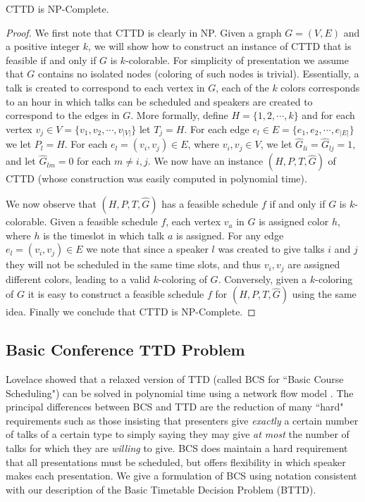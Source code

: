 \documentclass{svjour3}                     %
\begin{document}
\begin{proposition}\label{cttd_np}
	CTTD is NP-Complete.
\end{proposition}
\begin{proof}
We first note that CTTD is clearly in NP.  
Given a graph $G=(V,E)$ and a positive integer $k$, we will show how to construct an instance of CTTD that is feasible if and only if $G$ is $k$-colorable.
For simplicity of presentation we assume that $G$ contains no isolated nodes (coloring of such nodes is trivial).
Essentially, a talk is created to correspond to each vertex in $G$, each of the $k$ colors corresponds to an hour in which talks can be scheduled and speakers are created to correspond to the edges in $G$.
More formally, define $H=\{1, 2, \cdots, k\}$ and for each vertex $v_j \in V=\{v_1, v_2, \cdots, v_{|V|}\}$ let $T_j = H$. 
For each edge $e_l \in E=\{e_1, e_2, \cdots, e_{|E|}\}$ we let $P_l = H$. 
For each $e_l = (v_i,v_j)\in E$, where $v_i,v_j \in V$, we let $\hat G_{li} = \hat G_{lj} = 1$, and let $\hat G_{lm}=0$ for each $m\neq i,j$. 
We now have an instance $(H, P, T, \hat G)$ of CTTD (whose construction was easily computed in polynomial time). 

We now observe that $(H, P, T, \hat G)$ has a feasible schedule $f$ if and only if $G$ is $k$-colorable.
Given a feasible schedule $f$, each vertex $v_a$ in $G$ is assigned color $h$, where $h$ is the timeslot in which talk $a$ is assigned.
For any edge $e_l=(v_i,v_j)\in E$ we note that since a speaker $l$ was created to give talks $i$ and $j$ they will not be scheduled in the same time slots, and thus $v_i,v_j$ are assigned different colors, leading to a valid $k$-coloring of $G$.
Conversely, given a $k$-coloring of $G$ it is easy to construct a feasible schedule $f$ for $(H, P, T, \hat G)$ using the same idea.
Finally we conclude that CTTD is NP-Complete.
\end{proof}


\subsection{Basic Conference TTD Problem}
Lovelace showed that a relaxed version of TTD (called BCS for ``Basic Course Scheduling") can be solved in polynomial time using a network flow model \cite{lovelace2010}. 
The principal differences between BCS and TTD are the reduction of many ``hard" requirements such as those insisting that presenters give \emph{exactly} a certain number of talks of a certain type to simply saying they may give \emph{at most} the number of talks for which they are \emph{willing} to give. 
BCS does maintain a hard requirement that all presentations must be scheduled, but offers flexibility in which speaker makes each presentation.
We give a formulation of BCS using notation consistent with our description of the Basic Timetable Decision Problem (BTTD).
\end{document}
